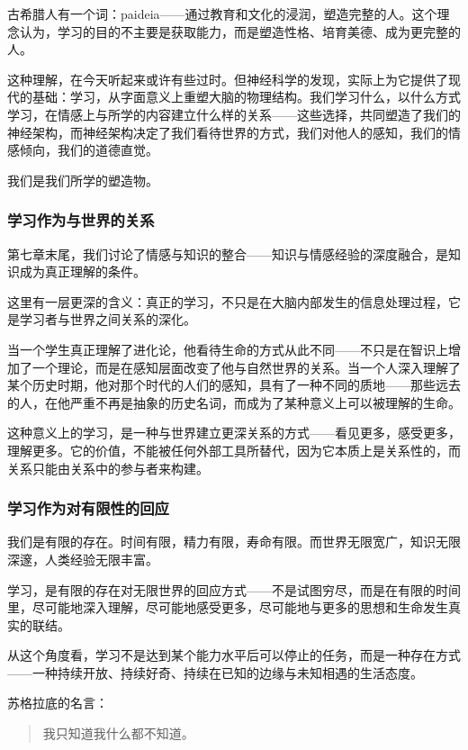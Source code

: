 \documentclass[11pt]{article}
\begin{document}
古希腊人有一个词：paideia——通过教育和文化的浸润，塑造完整的人。这个理念认为，学习的目的不主要是获取能力，而是塑造性格、培育美德、成为更完整的人。

这种理解，在今天听起来或许有些过时。但神经科学的发现，实际上为它提供了现代的基础：学习，从字面意义上重塑大脑的物理结构。我们学习什么，以什么方式学习，在情感上与所学的内容建立什么样的关系——这些选择，共同塑造了我们的神经架构，而神经架构决定了我们看待世界的方式，我们对他人的感知，我们的情感倾向，我们的道德直觉。

我们是我们所学的塑造物。
\subsubsection{学习作为与世界的关系}
\label{sec:org1037e8d}

第七章末尾，我们讨论了情感与知识的整合——知识与情感经验的深度融合，是知识成为真正理解的条件。

这里有一层更深的含义：真正的学习，不只是在大脑内部发生的信息处理过程，它是学习者与世界之间关系的深化。

当一个学生真正理解了进化论，他看待生命的方式从此不同——不只是在智识上增加了一个理论，而是在感知层面改变了他与自然世界的关系。当一个人深入理解了某个历史时期，他对那个时代的人们的感知，具有了一种不同的质地——那些远去的人，在他严重不再是抽象的历史名词，而成为了某种意义上可以被理解的生命。

这种意义上的学习，是一种与世界建立更深关系的方式——看见更多，感受更多，理解更多。它的价值，不能被任何外部工具所替代，因为它本质上是关系性的，而关系只能由关系中的参与者来构建。
\subsubsection{学习作为对有限性的回应}
\label{sec:orgf1e21e6}

我们是有限的存在。时间有限，精力有限，寿命有限。而世界无限宽广，知识无限深邃，人类经验无限丰富。

学习，是有限的存在对无限世界的回应方式——不是试图穷尽，而是在有限的时间里，尽可能地深入理解，尽可能地感受更多，尽可能地与更多的思想和生命发生真实的联结。

从这个角度看，学习不是达到某个能力水平后可以停止的任务，而是一种存在方式——一种持续开放、持续好奇、持续在已知的边缘与未知相遇的生活态度。

苏格拉底的名言：

\begin{quote}
我只知道我什么都不知道。
\end{quote}
\end{document}
